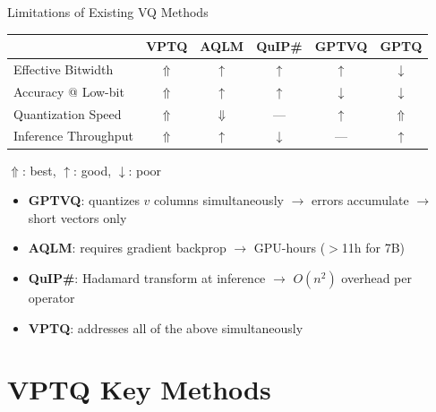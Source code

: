 \begin{frame}{Limitations of Existing VQ Methods}
  \begin{center}
    \small
    \begin{tabular}{lccccc}
      \toprule
      & \textbf{VPTQ} & AQLM & QuIP\# & GPTVQ & GPTQ \\
      \midrule
      Effective Bitwidth   & \textcolor{mycolor}{$\Uparrow$} & $\uparrow$ & $\uparrow$ & $\uparrow$ & $\downarrow$ \\
      Accuracy @ Low-bit   & \textcolor{mycolor}{$\Uparrow$} & $\uparrow$ & $\uparrow$ & $\downarrow$ & $\downarrow$ \\
      Quantization Speed   & \textcolor{mycolor}{$\Uparrow$} & $\Downarrow$ & --- & $\uparrow$ & $\Uparrow$ \\
      Inference Throughput & \textcolor{mycolor}{$\Uparrow$} & $\uparrow$ & $\downarrow$ & --- & $\uparrow$ \\
      \bottomrule
    \end{tabular}
    \par\vspace{0.3em}\small $\Uparrow$: best, $\uparrow$: good, $\downarrow$: poor
  \end{center}
  \vspace{0.3em}
  \begin{itemize}
    \item \textbf{GPTVQ}: quantizes $v$ columns simultaneously $\rightarrow$ errors accumulate $\rightarrow$ short vectors only
    \item \textbf{AQLM}: requires gradient backprop $\rightarrow$ GPU-hours ($>$11h for 7B)
    \item \textbf{QuIP\#}: Hadamard transform at inference $\rightarrow$ $O(n^2)$ overhead per operator
    \item \textbf{VPTQ}: addresses all of the above simultaneously
  \end{itemize}
\end{frame}

\section{VPTQ Key Methods}

